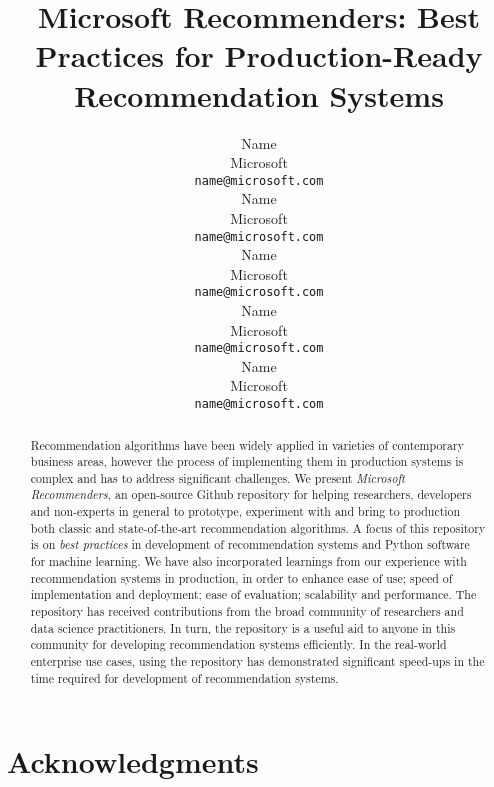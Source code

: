 \documentclass{article}
\title{Microsoft Recommenders: Best Practices for Production-Ready Recommendation Systems}
\author{%
  Name \\
  Microsoft\\
  \texttt{name@microsoft.com} \\
   \And
   Name \\
   Microsoft\\
   \texttt{name@microsoft.com} \\ 
   \And
   Name \\
   Microsoft\\
   \texttt{name@microsoft.com} \\
   \And
   Name \\
   Microsoft\\
   \texttt{name@microsoft.com} \\
   \And
   Name \\
   Microsoft\\
   \texttt{name@microsoft.com} \\
}
\begin{document}
\maketitle

\begin{abstract}
Recommendation algorithms have been widely applied in varieties of contemporary business areas, however the process of implementing them in production 
systems is complex and has to address significant challenges. We present {\em Microsoft Recommenders},  
an open-source Github repository for helping researchers, developers and non-experts in general to prototype, experiment with and
bring to production both classic and state-of-the-art recommendation algorithms.
A focus of this repository is on {\em best practices} in development of recommendation systems and Python software for machine learning.
We have also incorporated learnings from our experience with recommendation systems in production, in order to enhance ease of use; speed of 
implementation and deployment; ease of evaluation; scalability and performance. 
The repository has received contributions from the broad community of researchers and data science practitioners. 
In turn, the repository is a useful aid to anyone in this community for developing recommendation systems efficiently.
In the real-world enterprise use cases, using the repository has demonstrated significant speed-ups in the time required for development of recommendation systems. 
\end{abstract}






%
%
% 
%
%
%











\section*{Acknowledgments}


\end{document}
